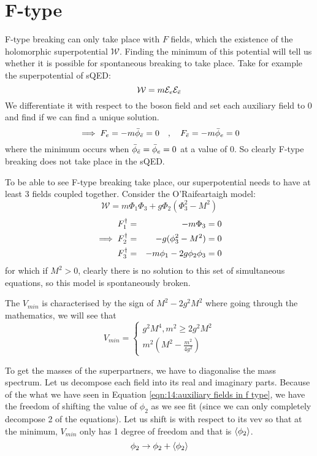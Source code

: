\section{F-type}
\label{ch:14:f-type breaking}
F-type breaking can only take place with $F$ fields, which the existence of the holomorphic superpotential $\mathcal{W}$. Finding the minimum of this potential will tell us whether it is possible for spontaneous breaking to take place. Take for example the superpotential of sQED:
\begin{equation}
    \mathcal{W} = m \mathcal{E}_e\mathcal{E}_{\Bar{e}}
\end{equation}
We differentiate it with respect to the boson field and set each auxiliary field to $0$ and find if we can find a unique solution.
\begin{equation}
    \implies F_e = -m \Bar{\phi}_{\Bar{e}} = 0\quad , \quad F_{\Bar{e}} = -m \Bar{\phi}_e = 0
\end{equation}
where the minimum occurs when $\Bar{\phi}_{\Bar{e}} = \Bar{\phi}_e = 0$ at a value of $0$. So clearly F-type breaking does not take place in the sQED.

To be able to see F-type breaking take place, our superpotential needs to have at least 3 fields coupled together. Consider the O'Raifeartaigh model:
\begin{equation}
    \mathcal{W} = m\Phi_1 \Phi_3 + g\Phi_2 (\Phi_3^2 - M^2)
\end{equation}
\begin{eqnarray}
    F_1^\dagger &=& -m\Phi_3 = 0 \nonext
    \implies F_2^\dagger &=& -g(\phi_3^2 - M^2) = 0\nonext
    F_3^\dagger &=& -m\phi_1 - 2g\phi_2 \phi_3 = 0 
    \label{eqn:14:auxiliary fields in f type}
\end{eqnarray}
for which if $M^2 > 0$, clearly there is no solution to this set of simultaneous equations, so this model is spontaneously broken.

The $V_{min}$ is characterised by the sign of $M^2 - 2g^2 M^2$ where going through the mathematics, we will see that
\begin{equation}
    V_{min} =
    \begin{cases}
        g^2 M^4, m^2 \geq 2g^2 M^2 \\
        m^2 \left(M^2 - \frac{m^2}{4g^2}\right)
    \end{cases}
\end{equation}

To get the masses of the superpartners, we have to diagonalise the mass spectrum. Let us decompose each field into its real and imaginary parts. Because of the what we have seen in Equation \ref{eqn:14:auxiliary fields in f type}, we have the freedom of shifting the value of $\phi_2$ as we see fit (since we can only completely decompose 2 of the equations). Let us shift is with respect to its vev so that at the minimum, $V_{min}$ only has 1 degree of freedom and that is $\braket{\phi_2}$.
\begin{equation}
    \phi_2 \rightarrow \phi_2 + \braket{\phi_2}
\end{equation}

